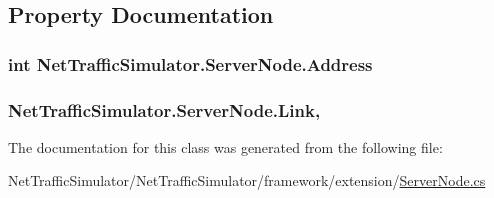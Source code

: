 \subsection{Property Documentation}
\hypertarget{classNetTrafficSimulator_1_1ServerNode_a52165503cd66de69748e5e4e5b9cedd4}{
\subsubsection[{Address}]{\setlength{\rightskip}{0pt plus 5cm}int Net\-Traffic\-Simulator.\-Server\-Node.\-Address\hspace{0.3cm}{\ttfamily [get]}}}\label{classNetTrafficSimulator_1_1ServerNode_a52165503cd66de69748e5e4e5b9cedd4}
\hypertarget{classNetTrafficSimulator_1_1ServerNode_a2fb3b251c8ad36760f68b8f7f4bc4c5b}{
\subsubsection[{Link}]{ Net\-Traffic\-Simulator.\-Server\-Node.\-Link\hspace{0.3cm}{\ttfamily [get]}, {\ttfamily [set]}}}\label{classNetTrafficSimulator_1_1ServerNode_a2fb3b251c8ad36760f68b8f7f4bc4c5b}


The documentation for this class was generated from the following file\-:\begin{DoxyCompactItemize}
\item 
Net\-Traffic\-Simulator/\-Net\-Traffic\-Simulator/framework/extension/\hyperlink{ServerNode_8cs}{Server\-Node.\-cs}\end{DoxyCompactItemize}
